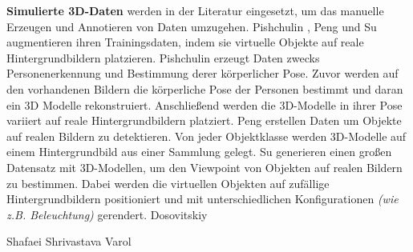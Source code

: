 \textbf{Simulierte 3D-Daten} werden in der Literatur eingesetzt, um das manuelle Erzeugen und Annotieren von Daten umzugehen. Pishchulin \etal\cite{pishchulinArticulatedPeopleDetection2012a}, Peng \etal\cite{pengLearningDeepObject2014} und Su \etal\cite{suRenderCNNViewpoint2015} augmentieren ihren Trainingsdaten, indem sie virtuelle Objekte auf reale Hintergrundbildern platzieren. Pishchulin \etal\cite{pishchulinArticulatedPeopleDetection2012a} erzeugt Daten zwecks Personenerkennung und Bestimmung derer körperlicher Pose. Zuvor werden auf den vorhandenen Bildern die körperliche Pose der Personen bestimmt und daran ein 3D Modelle rekonstruiert. Anschließend werden die 3D-Modelle in ihrer Pose variiert auf reale Hintergrundbildern platziert. Peng \etal\cite{pengLearningDeepObject2014} erstellen Daten um Objekte auf realen Bildern zu detektieren. Von jeder Objektklasse werden 3D-Modelle auf einem Hintergrundbild aus einer Sammlung gelegt. Su \etal\cite{suRenderCNNViewpoint2015} generieren einen großen Datensatz mit 3D-Modellen, um den Viewpoint von Objekten auf realen Bildern zu bestimmen. Dabei werden die virtuellen Objekten auf zufällige Hintergrundbildern positioniert und mit unterschiedlichen Konfigurationen \textit{(wie z.B. Beleuchtung)} gerendert. Dosovitskiy \etal\cite{dosovitskiyFlowNetLearningOptical2015} 

Shafaei \etal\cite{shafaeiPlayLearnUsing2016} 
Shrivastava \etal\cite{shrivastavaLearningSimulatedUnsupervised2017} 
Varol \etal\cite{varolLearningSyntheticHumans2017} 


% 
